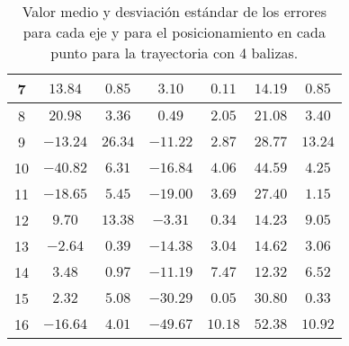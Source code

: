 \begin{table}[H]
\begin{tabular}{|c|c|c|c|c|c|c|}
                        7   &   $13.84$   &  $0.85$  &  $3.10$    &   $0.11$   &  $14.19$  &  $0.85$   \\ \hline
                        8   &   $20.98$   &  $3.36$  &  $0.49$    &   $2.05$   &  $21.08$  &  $3.40$   \\ \hline
                        9   &   $-13.24$  &  $26.34$ &  $-11.22$  &   $2.87$   &  $28.77$  &  $13.24$  \\ \hline
                        10  &   $-40.82$  &  $6.31$  &  $-16.84$  &   $4.06$   &  $44.59$  &  $4.25$   \\ \hline
                        11  &   $-18.65$  &  $5.45$  &  $-19.00$  &   $3.69$   &  $27.40$  &  $1.15$   \\ \hline
                        12  &   $9.70$    &  $13.38$ &  $-3.31$   &   $0.34$   &  $14.23$  &  $9.05$   \\ \hline
                        13  &   $-2.64$   &  $0.39$  &  $-14.38$  &   $3.04$   &  $14.62$  &  $3.06$   \\ \hline
                        14  &   $3.48$    &  $0.97$  &  $-11.19$  &   $7.47$   &  $12.32$  &  $6.52$   \\ \hline
                        15  &   $2.32$    &  $5.08$  &  $-30.29$  &   $0.05$   &  $30.80$  &  $0.33$   \\ \hline
                        16  &   $-16.64$  &  $4.01$  &  $-49.67$  &   $10.18$  &  $52.38$  &  $10.92$  \\ \hline
    \end{tabular}
    \caption{Valor medio y desviación estándar de los errores para cada eje y para el posicionamiento en cada punto para la trayectoria con 4 balizas.}
    \label{tab:media_fisica_4_total}
\end{table}

\newpage
